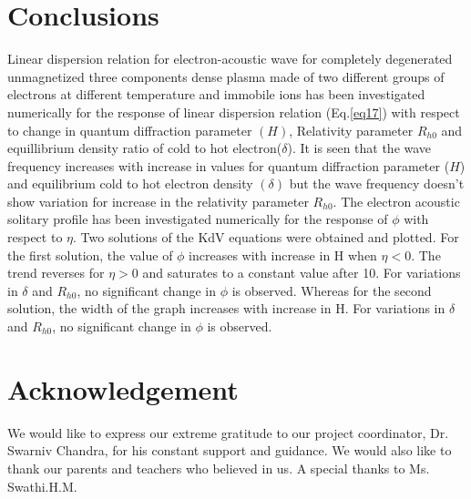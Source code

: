 \documentclass[journal]{IEEEtran}
\begin{document}
\section{Conclusions}\label{V}

Linear dispersion relation for electron-acoustic wave for completely degenerated unmagnetized three components dense plasma made of two different groups of electrons at different temperature and immobile ions has been investigated numerically for the response of linear dispersion relation (Eq.\ref{eq17}) with respect to change in quantum diffraction parameter $(H)$, Relativity parameter ${R_{h0}}$ and equillibrium density ratio of cold to hot electron($\delta$). It is seen that the wave frequency increases with increase in values for quantum diffraction parameter ($H$) and equilibrium cold to hot electron density $(\delta)$ but the wave frequency doesn't show variation for increase in the relativity parameter $R_{h0}$.
The electron acoustic solitary profile has been investigated numerically for the response of $\phi$ with respect to $\eta$. Two solutions of the KdV equations were obtained and plotted. For the first solution, the value of $\phi$ increases with increase in H when $\eta<0$. The trend reverses for $\eta>0$ and saturates to a constant value after 10. For variations in $\delta$ and $R_{h0}$, no significant change in $\phi$ is observed. Whereas for the second solution, the width of the graph increases with increase in H. For variations in $\delta$ and $R_{h0}$, no significant change in $\phi$ is observed.
\section{Acknowledgement}\label{VI}
We would like to express our extreme gratitude to our project coordinator, Dr. Swarniv Chandra, for his constant support and guidance. We would also like to thank our parents and teachers who believed in us. A special thanks to Ms. Swathi.H.M.   




\end{document}
